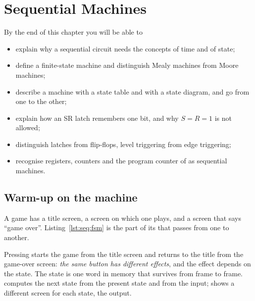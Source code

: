 \chapter{Sequential Machines}
\label{ch:sequential}


\begin{chapgoals}
By the end of this chapter you will be able to
\begin{itemize}
\item explain why a sequential circuit needs the concepts of time and of state;
\item define a finite-state machine and distinguish Mealy machines from Moore machines;
\item describe a machine with a state table and with a state diagram, and go from one to the other;
\item explain how an SR latch remembers one bit, and why $S=R=1$ is not allowed;
\item distinguish latches from flip-flops, level triggering from edge triggering;
\item recognise registers, counters and the program counter of \riscv as sequential machines.
\end{itemize}
\end{chapgoals}


\section{Warm-up on the machine}

A game has a title screen, a screen on which one plays, and a screen that says
``game over''. Listing~\ref{lst:seq:fsm} is the part of its 
that passes from one to another.


Pressing  starts the game from the title screen and returns to the
title from the game-over screen: \emph{the same button has different effects},
and the effect depends on the state. The state is one word in memory that
survives from frame to frame.  computes the next state from the
present state and from the input;  shows a different screen for
each state, the output.

